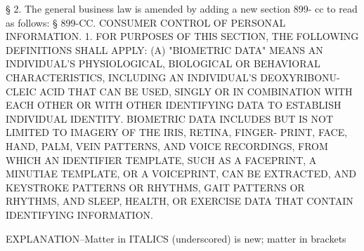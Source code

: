    §  2. The general business law is amended by adding a new section 899-
 cc to read as follows:
   § 899-CC. CONSUMER CONTROL OF PERSONAL INFORMATION. 1. FOR PURPOSES OF
 THIS SECTION, THE FOLLOWING DEFINITIONS SHALL APPLY:
   (A) "BIOMETRIC DATA" MEANS AN INDIVIDUAL'S  PHYSIOLOGICAL,  BIOLOGICAL
 OR  BEHAVIORAL  CHARACTERISTICS,  INCLUDING AN INDIVIDUAL'S DEOXYRIBONU-
 CLEIC ACID THAT CAN BE USED, SINGLY OR IN COMBINATION WITH EACH OTHER OR
 WITH OTHER IDENTIFYING DATA TO ESTABLISH INDIVIDUAL IDENTITY.  BIOMETRIC
 DATA INCLUDES BUT IS NOT LIMITED TO IMAGERY OF THE IRIS, RETINA, FINGER-
 PRINT, FACE, HAND, PALM, VEIN PATTERNS, AND VOICE RECORDINGS, FROM WHICH
 AN  IDENTIFIER  TEMPLATE, SUCH AS A FACEPRINT, A MINUTIAE TEMPLATE, OR A
 VOICEPRINT, CAN BE EXTRACTED, AND KEYSTROKE PATTERNS  OR  RHYTHMS,  GAIT
 PATTERNS  OR  RHYTHMS,  AND SLEEP, HEALTH, OR EXERCISE DATA THAT CONTAIN
 IDENTIFYING INFORMATION.
 
  EXPLANATION--Matter in ITALICS (underscored) is new; matter in brackets